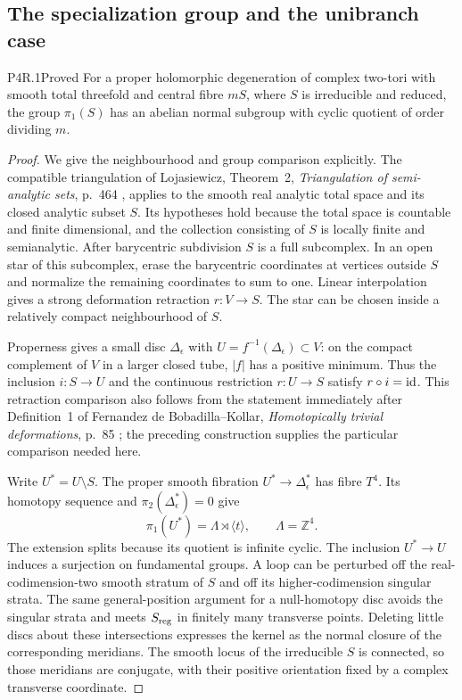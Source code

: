 \subsection{The specialization group and the unibranch case}

\begin{statement}{P4R.1}{Proved}
For a proper holomorphic degeneration of complex two-tori with
smooth total threefold and central fibre $mS$, where $S$ is
irreducible and reduced, the group $\pi_1(S)$ has an abelian
normal subgroup with cyclic quotient of order dividing $m$.
\end{statement}
\begin{proof}
We give the neighbourhood and group comparison explicitly.
The compatible triangulation of Lojasiewicz, Theorem~2,
\emph{Triangulation of semi-analytic sets}, p.~464 \cite{Lojasiewicz1964}, applies to
the smooth real analytic total space and its closed analytic
subset $S$. Its hypotheses hold because the total space is
countable and finite dimensional, and the collection consisting
of $S$ is locally finite and semianalytic. After barycentric
subdivision $S$ is a full subcomplex. In an open star of this
subcomplex, erase the barycentric coordinates at vertices
outside $S$ and normalize the remaining coordinates to sum
to one. Linear interpolation gives a strong deformation
retraction $r:V\to S$. The star can be chosen inside a
relatively compact neighbourhood of $S$.

Properness gives a small disc $\Delta_\epsilon$ with
$U=f^{-1}(\Delta_\epsilon)\subset V$: on the compact
complement of $V$ in a larger closed tube, $|f|$ has a
positive minimum. Thus the inclusion $i:S\to U$ and the
continuous restriction $r:U\to S$ satisfy $r\circ i=\mathrm{id}$.
This retraction comparison also follows from the statement
immediately after Definition~1 of Fernandez de Bobadilla--Kollar,
\emph{Homotopically trivial deformations}, p.~85 \cite{BobadillaKollar2012}; the preceding
construction supplies the particular comparison needed here.

Write $U^*=U\setminus S$. The proper smooth fibration
$U^*\to\Delta_\epsilon^*$ has fibre $T^4$. Its homotopy
sequence and $\pi_2(\Delta_\epsilon^*)=0$ give
\[
 \pi_1(U^*)=\Lambda\rtimes\langle t\rangle,
 \qquad \Lambda=\mathbb Z^4.
\]
The extension splits because its quotient is infinite cyclic.
The inclusion $U^*\to U$ induces a surjection on fundamental
groups. A loop can be perturbed off the real-codimension-two
smooth stratum of $S$ and off its higher-codimension singular
strata. The same general-position argument for a null-homotopy
disc avoids the singular strata and meets $S_{\rm reg}$ in
finitely many transverse points. Deleting little discs about
these intersections expresses the kernel as the normal closure
of the corresponding meridians. The smooth locus of the
irreducible $S$ is connected, so those meridians are conjugate,
with their positive orientation fixed by a complex transverse
coordinate.


\end{proof}
